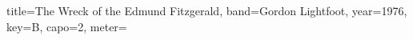 \documentclass{skrul-leadsheet}
\begin{document}
\begin{song}[transpose-capo=true]{title={The Wreck of the Edmund Fitzgerald}, band={Gordon Lightfoot}, year={1976}, key={B}, capo={2}, meter={}}



\end{song}
\end{document}

